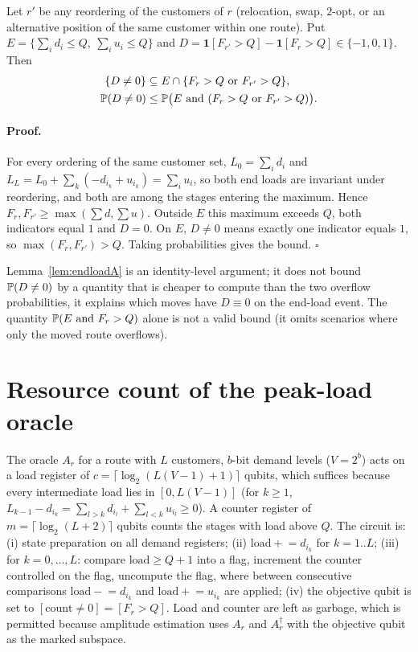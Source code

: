 \begin{lemma}\label{lem:endloadA}
Let $r'$ be any reordering of the customers of $r$ (relocation, swap, $2$-opt, or an alternative position of the same customer within one route). Put $E=\{\sum_i d_i\le Q,\ \sum_i u_i\le Q\}$ and $D=\mathbf 1[F_{r'}>Q]-\mathbf 1[F_r>Q]\in\{-1,0,1\}$. Then
\begin{align*}
\{D\neq0\}&\subseteq E\cap\{F_r>Q\ \text{or}\ F_{r'}>Q\},\\
\P(D\neq0)&\le\P\big(E\ \text{and}\ (F_r>Q\ \text{or}\ F_{r'}>Q)\big).
\end{align*}
\end{lemma}
\paragraph{Proof.} For every ordering of the same customer set, $L_0=\sum_i d_i$ and $L_L=L_0+\sum_k(-d_{i_k}+u_{i_k})=\sum_i u_i$, so both end loads are invariant under reordering, and both are among the stages entering the maximum. Hence $F_r,F_{r'}\ge\max(\sum d,\sum u)$. Outside $E$ this maximum exceeds $Q$, both indicators equal $1$ and $D=0$. On $E$, $D\ne0$ means exactly one indicator equals $1$, so $\max(F_r,F_{r'})>Q$. Taking probabilities gives the bound. \hfill$\square$

\begin{remark}
Lemma~\ref{lem:endloadA} is an identity-level argument; it does not bound $\P(D\neq0)$ by a quantity that is cheaper to compute than the two overflow probabilities, it explains which moves have $D\equiv0$ on the end-load event. The quantity $\P(E\text{ and }F_r>Q)$ alone is not a valid bound (it omits scenarios where only the moved route overflows).
\end{remark}

\section{Resource count of the peak-load oracle}\label{app:oracle}

The oracle $A_r$ for a route with $L$ customers, $b$-bit demand levels ($V=2^b$) acts on a load register of $c=\lceil\log_2(L(V-1)+1)\rceil$ qubits, which suffices because every intermediate load lies in $[0,L(V-1)]$ (for $k\ge 1$, $L_{k-1}-d_{i_k}=\sum_{l>k}d_{i_l}+\sum_{l<k}u_{i_l}\ge0$). A counter register of $m=\lceil\log_2(L+2)\rceil$ qubits counts the stages with load above $Q$. The circuit is: (i) state preparation on all demand registers; (ii) $\text{load}\mathrel{+}=d_{i_k}$ for $k=1..L$; (iii) for $k=0,\dots,L$: compare $\text{load}\ge Q+1$ into a flag, increment the counter controlled on the flag, uncompute the flag, where between consecutive comparisons $\text{load}\mathrel{-}=d_{i_k}$ and $\text{load}\mathrel{+}=u_{i_k}$ are applied; (iv) the objective qubit is set to $[\text{count}\ne0]=[F_r>Q]$. Load and counter are left as garbage, which is permitted because amplitude estimation uses $A_r$ and $A_r^\dagger$ with the objective qubit as the marked subspace.

